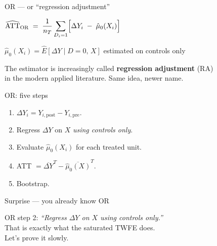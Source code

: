 \documentclass[aspectratio=169,11pt]{beamer}
\begin{document}
\begin{frame}{OR --- or ``regression adjustment''}
\vspace{0.6em}
\begin{center}
\large
$\widehat{\mathrm{ATT}}_{\mathrm{OR}}
  \;=\; \dfrac{1}{n_T}
        \displaystyle\sum_{D_i=1}
        \Bigl[\Delta Y_i \;-\; \hat\mu_0(X_i)\Bigr]$
\end{center}
\vspace{0.6em}
\begin{center}
\color{warmgray}\small
$\hat\mu_0(X_i) = \widehat{E}[\Delta Y \mid D{=}0,\,X]$ \quad estimated on controls only
\end{center}
\vspace{0.5em}
\begin{center}
\small
The estimator is increasingly called \textbf{regression adjustment} (RA)\\
in the modern applied literature. Same idea, newer name.
\end{center}
\end{frame}

\begin{frame}{OR: five steps}
\vspace{0.8em}
\begin{enumerate}\setlength\itemsep{0.5em}
  \item {} \;$\Delta Y_i = Y_{i,\mathrm{post}} - Y_{i,\mathrm{pre}}$.
  \item {} \;Regress $\Delta Y$ on $X$ \textit{using controls only}.
  \item {} \;Evaluate $\hat\mu_0(X_i)$ for each treated unit.
  \item {} \;ATT $= \overline{\Delta Y}^T - \overline{\hat\mu_0(X)}^T$.
  \item {} \;Bootstrap.
\end{enumerate}
\end{frame}

\begin{frame}{Surprise --- you already know OR}
\vspace{0.8em}
\begin{center}
\large
OR step 2: \emph{``Regress $\Delta Y$ on $X$ using controls only.''}\\[0.8em]
\color{warmgray}\normalsize
That is exactly what the saturated TWFE does.\\[0.4em]
Let's prove it slowly.
\end{center}
\end{frame}
\end{document}
